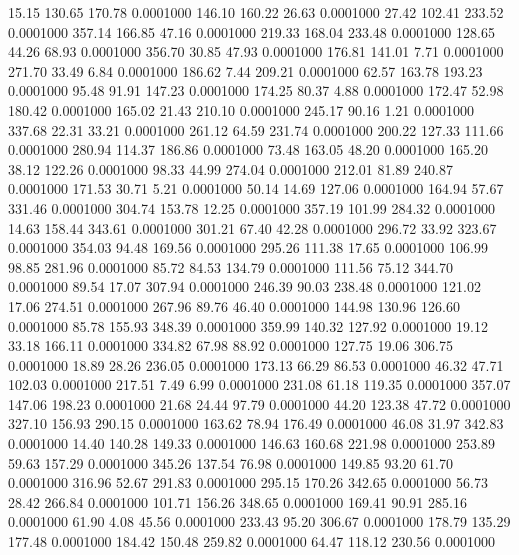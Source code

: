   15.15  130.65  170.78   0.0001000
 146.10  160.22   26.63   0.0001000
  27.42  102.41  233.52   0.0001000
 357.14  166.85   47.16   0.0001000
 219.33  168.04  233.48   0.0001000
 128.65   44.26   68.93   0.0001000
 356.70   30.85   47.93   0.0001000
 176.81  141.01    7.71   0.0001000
 271.70   33.49    6.84   0.0001000
 186.62    7.44  209.21   0.0001000
  62.57  163.78  193.23   0.0001000
  95.48   91.91  147.23   0.0001000
 174.25   80.37    4.88   0.0001000
 172.47   52.98  180.42   0.0001000
 165.02   21.43  210.10   0.0001000
 245.17   90.16    1.21   0.0001000
 337.68   22.31   33.21   0.0001000
 261.12   64.59  231.74   0.0001000
 200.22  127.33  111.66   0.0001000
 280.94  114.37  186.86   0.0001000
  73.48  163.05   48.20   0.0001000
 165.20   38.12  122.26   0.0001000
  98.33   44.99  274.04   0.0001000
 212.01   81.89  240.87   0.0001000
 171.53   30.71    5.21   0.0001000
  50.14   14.69  127.06   0.0001000
 164.94   57.67  331.46   0.0001000
 304.74  153.78   12.25   0.0001000
 357.19  101.99  284.32   0.0001000
  14.63  158.44  343.61   0.0001000
 301.21   67.40   42.28   0.0001000
 296.72   33.92  323.67   0.0001000
 354.03   94.48  169.56   0.0001000
 295.26  111.38   17.65   0.0001000
 106.99   98.85  281.96   0.0001000
  85.72   84.53  134.79   0.0001000
 111.56   75.12  344.70   0.0001000
  89.54   17.07  307.94   0.0001000
 246.39   90.03  238.48   0.0001000
 121.02   17.06  274.51   0.0001000
 267.96   89.76   46.40   0.0001000
 144.98  130.96  126.60   0.0001000
  85.78  155.93  348.39   0.0001000
 359.99  140.32  127.92   0.0001000
  19.12   33.18  166.11   0.0001000
 334.82   67.98   88.92   0.0001000
 127.75   19.06  306.75   0.0001000
  18.89   28.26  236.05   0.0001000
 173.13   66.29   86.53   0.0001000
  46.32   47.71  102.03   0.0001000
 217.51    7.49    6.99   0.0001000
 231.08   61.18  119.35   0.0001000
 357.07  147.06  198.23   0.0001000
  21.68   24.44   97.79   0.0001000
  44.20  123.38   47.72   0.0001000
 327.10  156.93  290.15   0.0001000
 163.62   78.94  176.49   0.0001000
  46.08   31.97  342.83   0.0001000
  14.40  140.28  149.33   0.0001000
 146.63  160.68  221.98   0.0001000
 253.89   59.63  157.29   0.0001000
 345.26  137.54   76.98   0.0001000
 149.85   93.20   61.70   0.0001000
 316.96   52.67  291.83   0.0001000
 295.15  170.26  342.65   0.0001000
  56.73   28.42  266.84   0.0001000
 101.71  156.26  348.65   0.0001000
 169.41   90.91  285.16   0.0001000
  61.90    4.08   45.56   0.0001000
 233.43   95.20  306.67   0.0001000
 178.79  135.29  177.48   0.0001000
 184.42  150.48  259.82   0.0001000
  64.47  118.12  230.56   0.0001000
